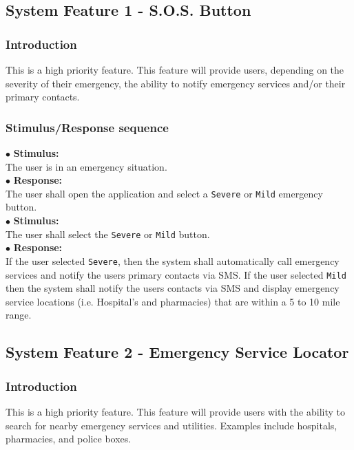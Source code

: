 \documentclass{scrreprt}
\begin{document}
\subsection{System Feature 1 - S.O.S. Button}
\subsubsection{Introduction}
This is a high priority feature. This feature will provide users, depending on the severity of their emergency, the ability to notify emergency services and/or their primary contacts.


\subsubsection{Stimulus/Response sequence}
\vspace{4mm}
	$\bullet$ \textbf{Stimulus:} \\ \hspace{5mm} The user is in an emergency situation. \\
	$\bullet$ \textbf{Response:} \\ \hspace{5mm} The user shall open the application and select a \texttt{Severe} or \texttt{Mild} emergency button.
\vspace{4mm}\\
	\hspace{-4.75mm} $\bullet$ \textbf{Stimulus:} \\ \hspace{5mm} The user shall select the \texttt{Severe} or \texttt{Mild} button.\\
	$\bullet$ \textbf{Response:} \\ \hspace{5mm} If the user selected \texttt{Severe}, then the system shall automatically call emergency services and notify the users primary contacts via SMS. If the user selected \texttt{Mild} then the system shall notify the users contacts via SMS and display emergency service locations (i.e. Hospital's and pharmacies) that are within a 5 to 10 mile range. \\

\subsection{System Feature 2 - Emergency Service Locator}
\subsubsection{Introduction}
This is a high priority feature. This feature will provide users with the ability to search for nearby emergency services and utilities. Examples include hospitals, pharmacies, and police boxes.
\end{document}
